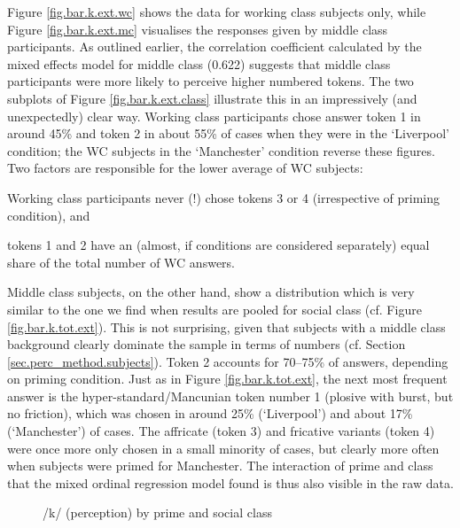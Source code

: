 Figure \ref{fig.bar.k.ext.wc} shows the data for working class subjects only, while Figure \ref{fig.bar.k.ext.mc} visualises the responses given by middle class participants.
As outlined earlier, the correlation coefficient calculated by the mixed effects model for middle class (0.622) suggests that middle class participants were more likely to perceive higher numbered tokens.
The two subplots of Figure \ref{fig.bar.k.ext.class} illustrate this in an impressively (and unexpectedly) clear way.
Working class participants chose answer token 1 in around 45\% and token 2 in about 55\% of cases when they were in the `Liverpool' condition; the WC subjects in the `Manchester' condition reverse these figures.
Two factors are responsible for the lower average of WC subjects:
\begin{inparaenum}[(a)]
	\item Working class participants never (!) chose tokens 3 or 4 (irrespective of priming condition), and
	\item tokens 1 and 2 have an (almost, if conditions are considered separately) equal share of the total number of WC answers.
\end{inparaenum} 

Middle class subjects, on the other hand, show a distribution which is very similar to the one we find when results are pooled for social class (cf. Figure \ref{fig.bar.k.tot.ext}).
This is not surprising, given that subjects with a middle class background clearly dominate the sample in terms of numbers (cf. Section \ref{sec.perc_method.subjects}).
Token 2 accounts for 70--75\% of answers, depending on priming condition.
Just as in Figure \ref{fig.bar.k.tot.ext}, the next most frequent answer is the hyper-standard/Mancunian token number 1 (plosive with burst, but no friction), which was chosen in around 25\% (`Liverpool') and about 17\% (`Manchester') of cases.
The affricate (token 3) and fricative variants (token 4) were once more only chosen in a small minority of cases, but clearly more often when subjects were primed for Manchester.
The interaction of prime and class that the mixed ordinal regression model found is thus also visible in the raw data.

\begin{figure}[h]
	\centering
		\resizebox{.49\linewidth}{!}{} 
	\caption{/k/ (perception) by prime and social class}
	\label{fig.scatter.k.ext.classprime}
\end{figure}


